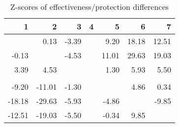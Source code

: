 \begin{table}[ht]
\centering
\begin{tabular}{rrrrrrr}
  \hline
1 & 2 & 3 & 4 & 5 & 6 & 7 \\ 
  \hline
 & 0.13 & -3.39 &  & 9.20 & 18.18 & 12.51 \\ 
  -0.13 &  & -4.53 &  & 11.01 & 29.63 & 19.03 \\ 
  3.39 & 4.53 &  &  & 1.30 & 5.93 & 5.50 \\ 
   &  &  &  &  &  &  \\ 
  -9.20 & -11.01 & -1.30 &  &  & 4.86 & 0.34 \\ 
  -18.18 & -29.63 & -5.93 &  & -4.86 &  & -9.85 \\ 
  -12.51 & -19.03 & -5.50 &  & -0.34 & 9.85 &  \\ 
   \hline
\end{tabular}
\caption{Z-scores of effectiveness/protection differences} 
\end{table}
